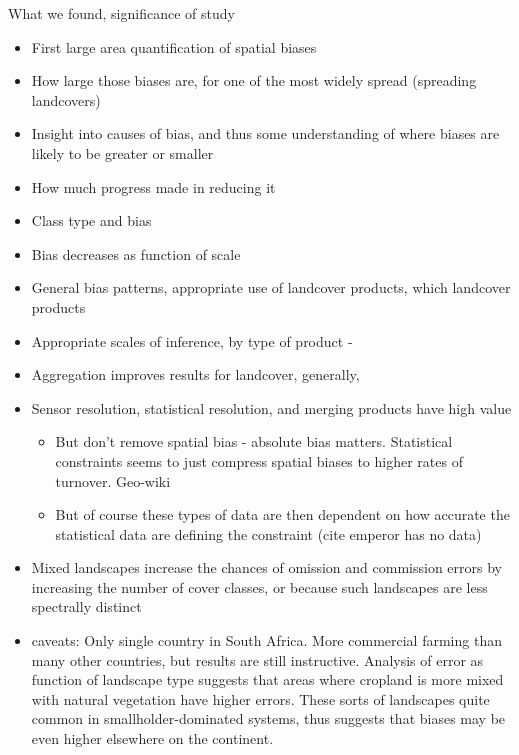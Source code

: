 \documentclass{pnastwo}
\begin{document}
\begin{article}
What we found, significance of study 
\begin{itemize}
  \item First large area quantification of spatial biases
  \item How large those biases are, for one of the most widely spread (spreading landcovers)
  \item Insight into causes of bias, and thus some understanding of where biases are likely to be greater or smaller
  \item How much progress made in reducing it
  \item Class type and bias
\end{itemize}

\begin{itemize}
  \item Bias decreases as function of scale
  \item General bias patterns, appropriate use of landcover products, which landcover products
  \item Appropriate scales of inference, by type of product - 
  \item Aggregation improves results for landcover, generally, 
  \item Sensor resolution, statistical resolution, and merging products have high value
   \begin{itemize}
     \item But don't remove spatial bias - absolute bias matters. Statistical constraints seems to just compress spatial biases to higher rates of turnover. Geo-wiki
     \item But of course these types of data are then dependent on how accurate the statistical data are defining the constraint (cite emperor has no data)
    \end{itemize}
   \item Mixed landscapes increase the chances of omission and commission errors by increasing the number of cover classes, or because such landscapes are less spectrally distinct \cite{estes_diylandcover:_2015}
   \item caveats: Only single country in South Africa. More commercial farming than many other countries, but results are still instructive. Analysis of error as function of landscape type suggests that areas where cropland is more mixed with natural vegetation have higher errors. These sorts of landscapes quite common in smallholder-dominated systems, thus suggests that biases may be even higher elsewhere on the continent. 
\end{itemize}


\end{article}
\end{document}
